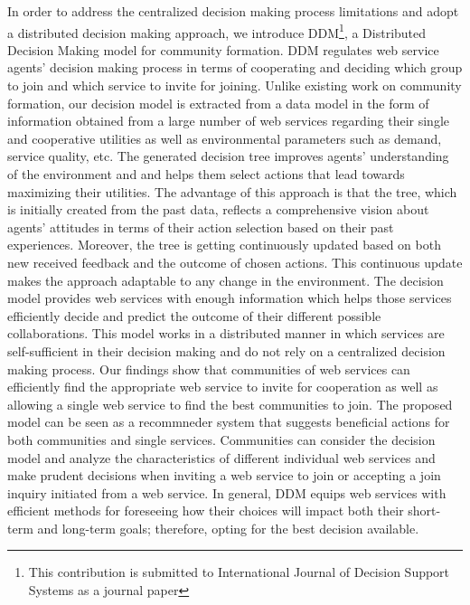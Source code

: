 In order to address the centralized decision making process limitations and adopt a distributed decision making approach, we introduce DDM\footnote{This contribution is submitted to International Journal of Decision Support Systems as a journal paper}, a Distributed Decision Making model for community formation. DDM regulates web service agents' decision making process in terms of cooperating and deciding which group to join and which service to invite for joining. Unlike existing work on community formation, our decision model is extracted from a data model in the form of information obtained from a large number of web services regarding their single and cooperative utilities as well as environmental parameters such as demand, service quality, etc. The generated decision tree improves agents' understanding of the environment and and helps them select actions that lead towards maximizing their utilities. The advantage of this approach is that the tree, which is initially created from the past data, reflects a comprehensive vision about agents' attitudes in terms of their action selection based on their past experiences. Moreover, the tree is getting continuously updated based on both new received feedback and the outcome of chosen actions. This continuous update makes the approach adaptable to any change in the environment.
The decision model provides web services with enough information which helps those services efficiently decide and predict the outcome of their different possible collaborations. This model works in a distributed manner in which services are self-sufficient in their decision making and do not rely on a centralized decision making process. Our findings show that communities of web services can efficiently find the appropriate web service to invite for cooperation as well as allowing a single web service to find the best communities to join. The proposed model can be seen as a recommneder system that suggests beneficial actions for both communities and single services. Communities can consider the decision model and analyze the characteristics of different individual web services and make prudent decisions when inviting a web service to join or accepting a join inquiry initiated from a web service. In general, DDM equips web services with efficient methods for foreseeing how their choices will impact both their short-term and long-term goals; therefore, opting for the best decision available.

